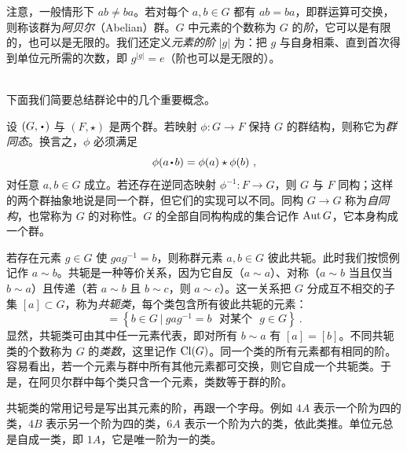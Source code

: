 
注意，一般情形下 $ab\neq ba$。若对每个 $a,b\in G$ 都有 $ab=ba$，即群运算可交换，则称该群为\emph{阿贝尔}（Abelian）群。$G$ 中元素的个数称为 $G$ 的\emph{阶}，它可以是有限的，也可以是无限的。我们还定义\emph{元素的阶} $|g|$ 为：把 $g$ 与自身相乘、直到首次得到单位元所需的次数，即 $g^{|g|}=e$（阶也可以是无限的）。

~\\
下面我们简要总结群论中的几个重要概念。

设 $(G,\bcdot)$ 与 $(F,\star)$ 是两个群。若映射 $\phi:G\rightarrow F$ 保持 $G$ 的群结构，则称它为\emph{群同态}。换言之，$\phi$ 必须满足
\begin{equation}
\phi(a\bcdot b)=\phi(a)\star\phi(b)~,
\end{equation}
对任意 $a,b\in G$ 成立。若还存在逆同态映射 $\phi^{-1}:F\rightarrow G$，则 $G$ 与 $F$ 同构；这样的两个群抽象地说是同一个群，但它们的实现可以不同。同构 $G\rightarrow G$ 称为\emph{自同构}，也常称为 $G$ 的对称性。$G$ 的全部自同构构成的集合记作 $\operatorname{\text{Aut}} G$，它本身构成一个群。

若存在元素 $g\in G$ 使 $gag^{-1}=b$，则称群元素 $a,b\in G$ 彼此共轭。此时我们按惯例记作 $a\sim b$。共轭是一种等价关系，因为它自反（$a\sim a$）、对称（$a\sim b$ 当且仅当 $b\sim a$）且传递（若 $a\sim b$ 且 $b\sim c$，则 $a\sim c$）。这一关系把 $G$ 分成互不相交的子集 $[a]\subset G$，称为\emph{共轭类}，每个类包含所有彼此共轭的元素：
\begin{equation}
[a]=\left\lbrace b\in G~|~gag^{-1}=b\text{~~对某个~~}g\in G\right\rbrace~.
\end{equation}
显然，共轭类可由其中任一元素代表，即对所有 $b\sim a$ 有 $[a]=[b]$。不同共轭类的个数称为 $G$ 的\emph{类数}，这里记作 $\text{Cl}(G)$。同一个类的所有元素都有相同的阶。容易看出，若一个元素与群中所有其他元素都可交换，则它自成一个共轭类。于是，在阿贝尔群中每个类只含一个元素，类数等于群的阶。


共轭类的常用记号是写出其元素的阶，再跟一个字母。例如 $4A$ 表示一个阶为四的类，$4B$ 表示另一个阶为四的类，$6A$ 表示一个阶为六的类，依此类推。单位元总是自成一类，即 $1A$，它是唯一阶为一的类。

